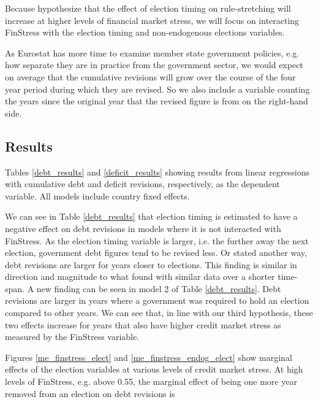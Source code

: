 \documentclass[]{article}
\begin{document}
Because hypothesize that the effect of election timing on rule-stretching will increase at higher levels of financial market stress, we will focus on interacting FinStress with the election timing and non-endogenous elections variables.

As Eurostat has more time to examine member state government policies, e.g. how separate they are in practice from the government sector, we would expect on average that the cumulative revisions will grow over the course of the four year period during which they are revised. So we also include a variable counting the years since the original year that the revised figure is from on the right-hand side.





\subsection{Results}

Tables \ref{debt_results} and \ref{deficit_results} showing results from linear regressions with cumulative debt and deficit revisions, respectively, as the dependent variable. All models include country fixed effects.

We can see in Table \ref{debt_results} that election timing is estimated to have a negative effect on debt revisions in models where it is not interacted with FinStress. As the election timing variable is larger, i.e. the further away the next election, government debt figures tend to be revised less. Or stated another way, debt revisions are larger for years closer to elections. This finding is similar in direction and magnitude to what \cite{DeCastro2013} found with similar data over a shorter time-span. A new finding can be seen in model 2 of Table \ref{debt_results}. Debt revisions are larger in years where a government was required to hold an election compared to other years. We can see that, in line with our third hypothesis, these two effects increase for years that also have higher credit market stress as measured by the FinStress variable.

Figures \ref{me_finstress_elect} and \ref{me_finstress_endog_elect} show marginal effects of the election variables at various levels of credit market stress. At high levels of FinStress, e.g. above 0.55, the marginal effect of being one more year removed from an election on debt revisions is
\end{document}
